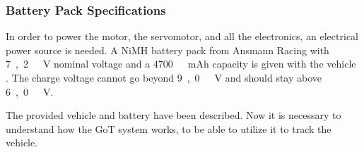 \subsubsection{Battery Pack Specifications} \label{sssec:BatterySpecs}
In order to power the motor, the servomotor, and all the electronics, an electrical power source is needed. A NiMH battery pack from Ansmann Racing with \si{7,2\ V} nominal voltage and a \si{4700\ mAh} capacity is given with the vehicle \cite{BatteryDS}. The charge voltage cannot go beyond \si{9,0\ V} and should stay above \si{6,0\ V}.

The provided vehicle and battery have been described. Now it is necessary to understand how the GoT system works, to be able to utilize it to track the vehicle.